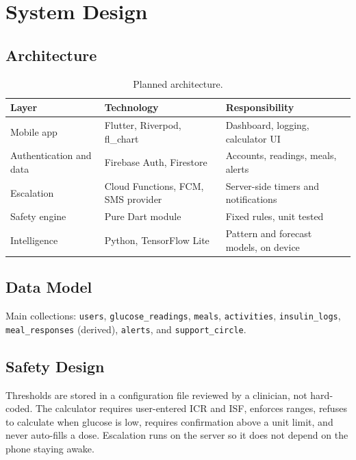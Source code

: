 \chapter{System Design}

\section{Architecture}
\begin{table}[h]
\centering
\small
\begin{tabularx}{\textwidth}{lXX}
\hline
Layer & Technology & Responsibility \\
\hline
Mobile app & Flutter, Riverpod, fl\_chart & Dashboard, logging, calculator UI \\
Authentication and data & Firebase Auth, Firestore & Accounts, readings, meals, alerts \\
Escalation & Cloud Functions, FCM, SMS provider & Server-side timers and notifications \\
Safety engine & Pure Dart module & Fixed rules, unit tested \\
Intelligence & Python, TensorFlow Lite & Pattern and forecast models, on device \\
\hline
\end{tabularx}
\caption{Planned architecture.}
\end{table}

\section{Data Model}
{\sloppy Main collections: \texttt{users}, \texttt{glucose\_readings}, \texttt{meals}, \texttt{activities}, \texttt{insulin\_logs}, \texttt{meal\_responses} (derived), \texttt{alerts}, and \texttt{support\_circle}.\par}

\section{Safety Design}
Thresholds are stored in a configuration file reviewed by a clinician, not hard-coded. The calculator requires user-entered ICR and ISF, enforces ranges, refuses to calculate when glucose is low, requires confirmation above a unit limit, and never auto-fills a dose. Escalation runs on the server so it does not depend on the phone staying awake.

